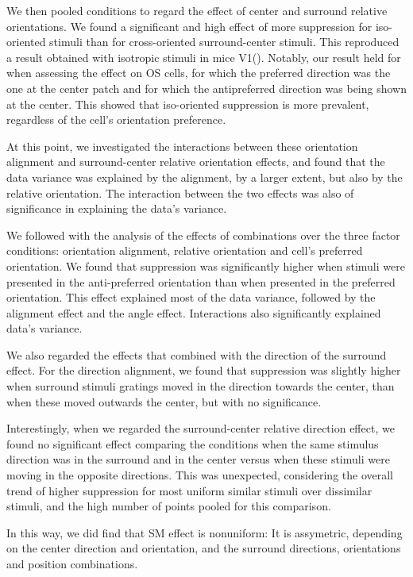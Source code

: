We then pooled conditions to regard the effect of center and surround relative orientations. We found a significant and high effect of more suppression for iso-oriented stimuli than for cross-oriented surround-center stimuli. This reproduced a result obtained with isotropic stimuli in mice V1(\cite{Self2014}). Notably, our result held for when assessing the effect on OS cells, for which the preferred direction was the one at the center patch and for which the antipreferred direction was being shown at the center. This showed that iso-oriented suppression is more prevalent, regardless of the cell's orientation preference.

At this point, we investigated the interactions between these orientation alignment and surround-center relative orientation effects, and found that the data variance was explained by the alignment, by a larger extent, but also by the relative orientation. The interaction between the two effects was also of significance in explaining the data's variance.

We followed with the analysis of the effects of combinations over the three factor conditions: orientation alignment, relative orientation and cell's preferred orientation. We found that suppression was significantly higher when stimuli were presented in the anti-preferred orientation than when presented in the preferred orientation. This effect explained most of the data variance, followed by the alignment effect and the angle effect. Interactions also significantly explained data's variance.

We also regarded the effects that combined with the direction of the surround effect. For the direction alignment, we found that suppression was slightly higher when surround stimuli gratings moved in the direction towards the center, than when these moved outwards the center, but with no significance.

Interestingly, when we regarded the surround-center relative direction effect, we found no significant effect comparing the conditions when the same stimulus direction was in the surround and in the center versus when these stimuli were moving in the opposite directions. This was unexpected, considering the overall trend of higher suppression for most uniform similar stimuli over dissimilar stimuli, and the high number of points pooled for this comparison.


In this way, we did find that SM effect is nonuniform: It is assymetric, depending on the center direction and orientation, and the surround directions, orientations and position combinations. 

